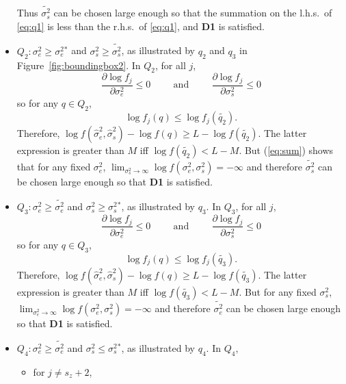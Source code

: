 \documentclass{report}
\newcommand{\RL}{f}
\newcommand{\logRL}{\log\RL}
\newcommand{\sigssq}{\sigma_s^2}
\newcommand{\sigesq}{\sigma_e^2}
\newcommand{\sshat}{\hat\sigma^2_e,\hat\sigma^2_s}
\newcommand{\logRLss}{\logRL(\sigesq,\sigssq)}
\begin{document}
\begin{itemize}
  Thus $\widetilde{\sigma_s^2}$ can be chosen large enough so that the summation on the
  l.h.s.~of \eqref{eq:q1} is less than the r.h.s.~of \eqref{eq:q1}, and  \textbf{D1} is satisfied.
\item $Q_2: \sigesq \ge \sigesq{}^*$ and $\sigssq \ge \widetilde{\sigssq}$, as illustrated by $q_2$ and $q_3$
  in Figure~\ref{fig:boundingbox2}.  In $Q_2$, for all $j$,
  \begin{equation*}
    \frac{\partial\logRL_j}{\partial\sigesq} \le 0 \hspace{1cm} \text{and} \hspace{1cm}
    \frac{\partial\logRL_j}{\partial\sigssq} \le 0
  \end{equation*}
  so for any $q \in Q_2$,
  \begin{equation*}
    \logRL_j(q) \le \logRL_j(\widetilde{q_2}).
  \end{equation*}
  Therefore, $\logRL(\sshat) - \logRL(q) \ge L - \logRL(\widetilde{q_2})$.  The latter expression is greater than
  $M$ iff $\logRL(\widetilde{q_2}) < L-M$.  But (\ref{eq:sum}) shows that for any fixed
  $\sigesq$, $\lim_{\sigssq \rightarrow \infty} \logRLss = -\infty$ and therefore $\widetilde{\sigma_s^2}$
  can be chosen large enough so that \textbf{D1} is satisfied.
\item $Q_3: \sigesq \ge \widetilde{\sigesq}$ and $\sigssq \ge \sigssq{}^*$, as illustrated by $q_3$.  In $Q_3$,
  for all $j$,
  \begin{equation*}
    \frac{\partial\logRL_j}{\partial\sigesq} \le 0 \hspace{1cm} \text{and} \hspace{1cm}
    \frac{\partial\logRL_j}{\partial\sigssq} \le 0
  \end{equation*}
  so for any $q \in Q_3$,
  \begin{equation*}
    \logRL_j(q) \le \logRL_j(\widetilde{q_3}).
  \end{equation*}
  Therefore, $\logRL(\sshat) - \logRL(q) \ge L - \logRL(\widetilde{q_3})$.  The latter expression is greater than
  $M$ iff $\logRL(\widetilde{q_3}) < L-M$.  But for any fixed $\sigssq$,
  $\lim_{\sigesq \rightarrow \infty} \logRLss = -\infty$ and therefore $\widetilde{\sigma_e^2}$
  can be chosen large enough so that \textbf{D1} is satisfied.
\item $Q_4: \sigesq \ge \widetilde{\sigesq}$ and $\sigssq \le \sigssq{}^*$, as illustrated by $q_4$.  In $Q_4$,
  \begin{itemize}
  \item for $j \ne s_z+2$,

\end{itemize}
\end{itemize}
\end{document}
